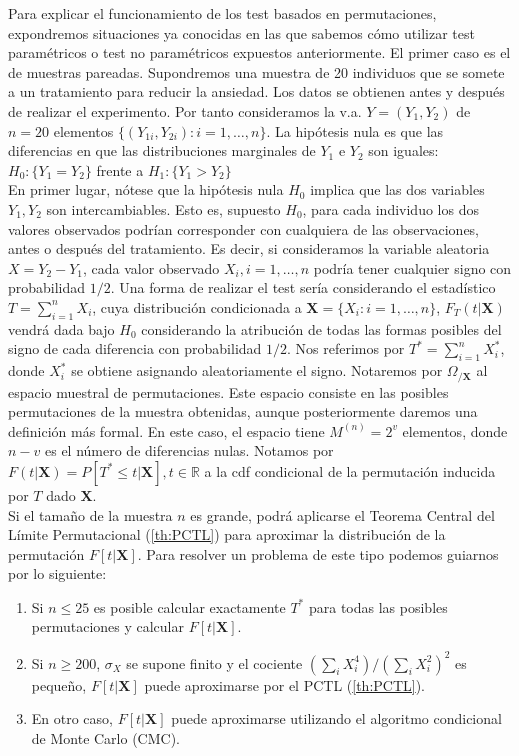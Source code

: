 	Para explicar el funcionamiento de los test basados en 
permutaciones, expondremos situaciones ya conocidas en las 
que sabemos cómo utilizar test paramétricos o test no 
paramétricos expuestos anteriormente. El primer caso es el de 
muestras pareadas. Supondremos una muestra de 20 individuos 
que se somete a un tratamiento para reducir la ansiedad. Los 
datos se obtienen antes y después de realizar el experimento. 
Por tanto consideramos la v.a. $Y = (Y_1, Y_2)$ de $n=20$ 
elementos $\{(Y_{1i},Y_{2i}): i = 1, \dots, n\}$. La 
hipótesis nula es que las diferencias en que las 
distribuciones marginales de $Y_1$ e $Y_2$ son iguales:
$H_0 : \{ Y_1 = Y_2 \}$ frente a $H_1: \{ Y_1 > Y_2 \}$\\
	
	En primer lugar, nótese que la hipótesis nula $H_0$ 
implica que las dos variables $Y_1, Y_2$ son intercambiables. 
Esto es, supuesto $H_0$, para cada individuo los dos valores 
observados podrían corresponder con cualquiera de las 
observaciones, antes o después del tratamiento. Es decir, si 
consideramos la variable aleatoria $X = Y_2 - Y_1$, cada 
valor observado $X_i, i=1, \dots, n$ podría tener cualquier 
signo con probabilidad $1/2$. Una forma de realizar el test 
sería considerando el estadístico $T = \sum\limits_{i=1}^n 
X_i$, cuya distribución condicionada a $\mathbf{X} = \{X_i: i 
= 1, \dots, n\}$, $F_T(t|\mathbf{X})$ vendrá dada bajo $H_0$ 
considerando la atribución de todas las formas posibles del 
signo de cada diferencia con probabilidad $1/2$. Nos 
referimos por $T^* = \sum\limits_{i=1}^n X_i^*$, donde 
$X_i^*$ se obtiene asignando aleatoriamente el signo. 
Notaremos por $\Omega_{/\mathbf{X}}$ al espacio muestral de 
permutaciones. Este espacio consiste en las posibles 
permutaciones de la muestra obtenidas, aunque posteriormente 
daremos una definición más formal. En este caso, el espacio 
tiene $M^{(n)} = 2^v$ elementos, donde $n-v$ es el número de 
diferencias nulas. Notamos por $F(t|\mathbf{X}) = P[T^* \leq 
t | \mathbf{X}], t \in \mathbb{R}$ a la cdf condicional de la 
permutación inducida por $T$ dado $\mathbf{X}$.\\
	Si el tamaño de la muestra $n$ es grande, podrá aplicarse 
el Teorema Central del Límite Permutacional (\ref{th:PCTL}) 
para aproximar la distribución de la permutación 
$F[t|\mathbf{X}]$. Para resolver un problema de este tipo 
podemos guiarnos por lo siguiente:
	
\begin{enumerate}[a]
	\item Si $n \leq 25$ es posible calcular exactamente 
		$T^*$  para todas las posibles permutaciones y 
		calcular $F[t|\mathbf{X}]$.
	\item Si $n \geq 200$, $\sigma_X$ se supone finito y el 
		cociente $(\sum_i X_i^4)/(\sum_i X_i^2)^2$ es 
		pequeño, $F[t|\mathbf{X}]$ puede aproximarse por 
		el PCTL (\ref{th:PCTL}). 
	\item En otro caso, $F[t|\mathbf{X}]$ puede aproximarse 
		utilizando el algoritmo condicional de Monte 
		Carlo (CMC).
\end{enumerate}
	

